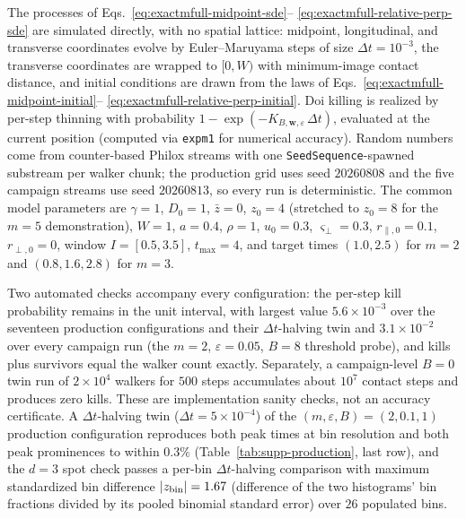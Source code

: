 \documentclass[aps,physrev,onecolumn,amsmath,amssymb,longbibliography]{revtex4-2}
\begin{document}
The processes of Eqs.~\eqref{eq:exactmfull-midpoint-sde}--%
\eqref{eq:exactmfull-relative-perp-sde} are simulated directly, with no
spatial lattice: midpoint, longitudinal, and transverse coordinates evolve
by Euler--Maruyama steps of size \(\Delta t=10^{-3}\), the transverse
coordinates are wrapped to \([0,W)\) with minimum-image contact distance,
and initial conditions are drawn from the laws of
Eqs.~\eqref{eq:exactmfull-midpoint-initial}--%
\eqref{eq:exactmfull-relative-perp-initial}.  Doi killing is realized by
per-step thinning with probability
\(1-\exp(-K_{B,\bm w,\varepsilon}\,\Delta t)\), evaluated at the current
position (computed via \texttt{expm1} for numerical accuracy).  Random
numbers come from counter-based Philox streams with one
\texttt{SeedSequence}-spawned substream per walker chunk; the production
grid uses seed \(20260808\) and the five campaign streams use seed
\(20260813\), so every run is deterministic.  The common model parameters
are \(\gamma=1\), \(D_0=1\), \(\bar z=0\), \(z_0=4\) (stretched to
\(z_0=8\) for the \(m=5\) demonstration), \(W=1\), \(a=0.4\), \(\rho=1\),
\(u_0=0.3\), \(\varsigma_\perp=0.3\), \(r_{\parallel,0}=0.1\),
\(r_{\perp,0}=0\), window \(I=[0.5,3.5]\), \(t_{\max}=4\), and target
times \((1.0,2.5)\) for \(m=2\) and \((0.8,1.6,2.8)\) for \(m=3\).

Two automated checks accompany every configuration: the per-step kill
probability remains in the unit interval, with largest value
\(5.6\times10^{-3}\) over the seventeen production configurations and their
\(\Delta t\)-halving twin and \(3.1\times10^{-2}\) over every campaign run
(the \(m=2\), \(\varepsilon=0.05\), \(B=8\) threshold probe), and kills plus
survivors equal the walker count exactly.  Separately, a campaign-level
\(B=0\) twin run of \(2\times10^{4}\) walkers for \(500\) steps accumulates
about \(10^{7}\) contact steps and produces zero kills.  These are
implementation sanity checks, not an accuracy certificate.  A
\(\Delta t\)-halving twin
(\(\Delta t=5\times10^{-4}\)) of the
\((m,\varepsilon,B)=(2,0.1,1)\) production configuration reproduces both
peak times at bin resolution and both peak prominences to within
\(0.3\%\) (Table~\ref{tab:supp-production}, last row), and the \(d=3\)
spot check passes a per-bin \(\Delta t\)-halving comparison with maximum
standardized bin difference \(|z_{\rm bin}|=1.67\) (difference of the two
histograms' bin fractions divided by its pooled binomial standard error)
over \(26\) populated bins.
\end{document}
